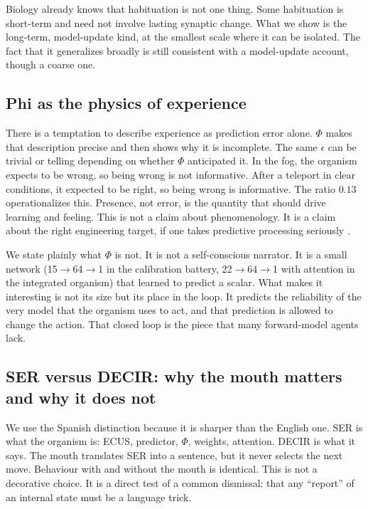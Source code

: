 \documentclass[11pt,a4paper]{article}
\begin{document}
Biology already knows that habituation is not one thing. Some habituation is short-term and need not involve lasting synaptic change. What we show is the long-term, model-update kind, at the smallest scale where it can be isolated. The fact that it generalizes broadly is still consistent with a model-update account, though a coarse one.

\subsection{Phi as the physics of experience}

There is a temptation to describe experience as prediction error alone. $\Phi$ makes that description precise and then shows why it is incomplete. The same $\epsilon$ can be trivial or telling depending on whether $\Phi$ anticipated it. In the fog, the organism expects to be wrong, so being wrong is not informative. After a teleport in clear conditions, it expected to be right, so being wrong is informative. The ratio $0.13$ operationalizes this. Presence, not error, is the quantity that should drive learning and feeling. This is not a claim about phenomenology. It is a claim about the right engineering target, if one takes predictive processing seriously \cite{friston2010, laukkonen2025}.

We state plainly what $\Phi$ is not. It is not a self-conscious narrator. It is a small network (15$\rightarrow$64$\rightarrow$1 in the calibration battery, 22$\rightarrow$64$\rightarrow$1 with attention in the integrated organism) that learned to predict a scalar. What makes it interesting is not its size but its place in the loop. It predicts the reliability of the very model that the organism uses to act, and that prediction is allowed to change the action. That closed loop is the piece that many forward-model agents lack.

\subsection{SER versus DECIR: why the mouth matters and why it does not}

We use the Spanish distinction because it is sharper than the English one. SER is what the organism is: ECUS, predictor, $\Phi$, weights, attention. DECIR is what it says. The mouth translates SER into a sentence, but it never selects the next move. Behaviour with and without the mouth is identical. This is not a decorative choice. It is a direct test of a common dismissal: that any ``report'' of an internal state must be a language trick.
\end{document}
